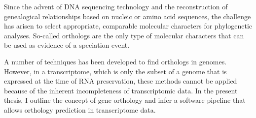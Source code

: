 Since the advent of DNA sequencing technology and the reconstruction of
genealogical relationships based on nucleic or amino acid sequences, the
challenge has arisen to select appropriate, comparable molecular characters for
phylogenetic analyses. So-called orthologs are the only type of molecular
characters that can be used as evidence of a speciation event. 

A number of techniques has been developed to find orthologs in genomes.
However, in a transcriptome, which is only the subset of a genome that is
expressed at the time of RNA preservation, these methods cannot be applied
because of the inherent incompleteness of transcriptomic data. In the present
thesis, I outline the concept  of gene orthology and infer a software pipeline
that allows orthology prediction in transcriptome data.

